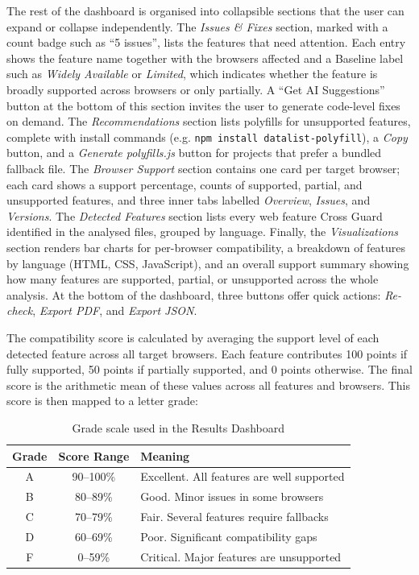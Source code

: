 The rest of the dashboard is organised into collapsible sections that the user can expand or collapse independently. The \emph{Issues \& Fixes} section, marked with a count badge such as ``5 issues'', lists the features that need attention. Each entry shows the feature name together with the browsers affected and a Baseline label such as \emph{Widely Available} or \emph{Limited}, which indicates whether the feature is broadly supported across browsers or only partially. A ``Get AI Suggestions'' button at the bottom of this section invites the user to generate code-level fixes on demand. The \emph{Recommendations} section lists polyfills for unsupported features, complete with install commands (e.g. \texttt{npm install datalist-polyfill}), a \emph{Copy} button, and a \emph{Generate polyfills.js} button for projects that prefer a bundled fallback file. The \emph{Browser Support} section contains one card per target browser; each card shows a support percentage, counts of supported, partial, and unsupported features, and three inner tabs labelled \emph{Overview}, \emph{Issues}, and \emph{Versions}. The \emph{Detected Features} section lists every web feature Cross Guard identified in the analysed files, grouped by language. Finally, the \emph{Visualizations} section renders bar charts for per-browser compatibility, a breakdown of features by language (HTML, CSS, JavaScript), and an overall support summary showing how many features are supported, partial, or unsupported across the whole analysis. At the bottom of the dashboard, three buttons offer quick actions: \emph{Re-check}, \emph{Export PDF}, and \emph{Export JSON}.

The compatibility score is calculated by averaging the support level of each detected feature across all target browsers. Each feature contributes 100 points if fully supported, 50 points if partially supported, and 0 points otherwise. The final score is the arithmetic mean of these values across all features and browsers. This score is then mapped to a letter grade:

\begin{table}[H]
    \centering
    \begin{tabular}{|c|c|l|}
        \hline
        \textbf{Grade} & \textbf{Score Range} & \textbf{Meaning} \\
        \hline \hline
        A & 90--100\% & Excellent. All features are well supported \\ \hline
        B & 80--89\%  & Good. Minor issues in some browsers \\ \hline
        C & 70--79\%  & Fair. Several features require fallbacks \\ \hline
        D & 60--69\%  & Poor. Significant compatibility gaps \\ \hline
        F & 0--59\%   & Critical. Major features are unsupported \\ \hline
    \end{tabular}
    \caption{Grade scale used in the Results Dashboard}
    \label{tab:gui-grades}
\end{table}

